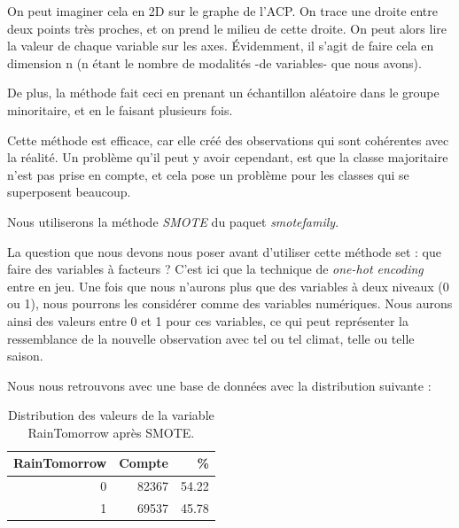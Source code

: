 \documentclass{article}
\begin{document}
On peut imaginer cela en 2D sur le graphe de l'ACP. On trace une droite entre deux points très proches, et on prend le milieu de cette droite. On peut alors lire la valeur de chaque variable sur les axes. Évidemment, il s'agit de faire cela en dimension n (n étant le nombre de modalités -de variables- que nous avons).

De plus, la méthode fait ceci en prenant un échantillon aléatoire dans le groupe minoritaire, et en le faisant plusieurs fois.

Cette méthode est efficace, car elle créé des observations qui sont cohérentes avec la réalité. Un problème qu'il peut y avoir cependant, est que la classe majoritaire n'est pas prise en compte, et cela pose un problème pour les classes qui se superposent beaucoup. 

Nous utiliserons la méthode \emph{SMOTE} du paquet \emph{smotefamily}.

La question que nous devons nous poser avant d'utiliser cette méthode set : que faire des variables à facteurs ? C'est ici que la technique de \emph{one-hot encoding} entre en jeu. Une fois que nous n'aurons plus que des variables à deux niveaux (0 ou 1), nous pourrons les considérer comme des variables numériques. Nous aurons ainsi des valeurs entre 0 et 1 pour ces variables, ce qui peut représenter la ressemblance de la nouvelle observation avec tel ou tel climat, telle ou telle saison. 

Nous nous retrouvons avec une base de données avec la distribution suivante : 

\begin{table}[H]
    \centering
        \begin{tabular}{|rrr|}
            \hline
            RainTomorrow & Compte & \% \\ 
            \hline
            \hline
            0 & 82367 & 54.22 \\
            1 & 69537 & 45.78 \\
            \hline
        \end{tabular}
    \caption{Distribution des valeurs de la variable RainTomorrow après SMOTE.}
\end{table}
\end{document}
